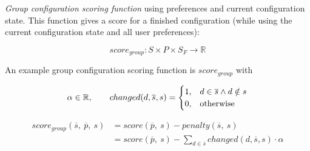
\emph{Group configuration scoring function} using preferences and current configuration state. This function gives a score for a finished configuration (while using the current configuration state and all user preferences):

\begin{equation}
    score_{group}: S \times P \times S_F \to \mathbb{R}
\end{equation}

An example group configuration scoring function is $score_{group}$ with

\begin{equation}
    \notag \alpha \in \mathbb{R}, \qquad     changed(d,\overline{s}, s) = 
    \begin{cases}
      1, & d \in \overline{s} \land d \notin s \\
      0, & \text{otherwise}
    \end{cases}
\end{equation}

\begin{equation}
    \begin{split}
        score_{group}(\overline{s},\ \overline{p},\ s)
        & = score(\overline{p},\ s) - penalty(\overline{s},\ s) \\
        & = score(\overline{p},\ s) - \sum_{d \in \overline{s}} changed(d,\overline{s}, s) \cdot \alpha
    \end{split}
\end{equation}

